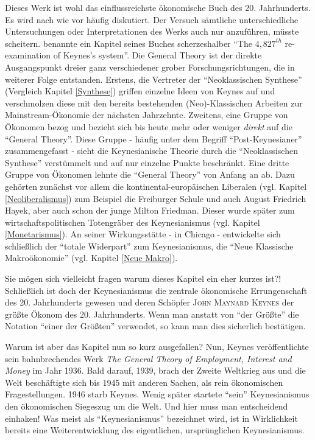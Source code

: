 Dieses Werk ist wohl das einflussreichste ökonomische Buch des 20. Jahrhunderts. Es wird nach wie vor häufig diskutiert. Der Versuch sämtliche unterschiedliche Untersuchungen oder Interpretationen des Werks auch nur anzuführen, müsste scheitern. \textcite[S. 38ff]{Weintraub1979} benannte ein Kapitel seines Buches scherzeshalber "`The $4,827^{th}$ re-examination of Keynes's system"'. Die General Theory ist der direkte Ausgangspunkt dreier ganz verschiedener grober Forschungsrichtungen, die in weiterer Folge entstanden. Erstens, die Vertreter der "`Neoklassischen Synthese"' (Vergleich Kapitel \ref{Synthese}) griffen einzelne Ideen von Keynes auf und verschmolzen diese mit den bereits bestehenden (Neo)-Klassischen Arbeiten zur Mainstream-Ökonomie der nächsten Jahrzehnte. Zweitens, eine Gruppe von Ökonomen bezog und bezieht sich bis heute mehr oder weniger \textit{direkt} auf die "`General Theory"'. Diese Gruppe - häufig unter dem Begriff "`Post-Keynesianer"' zusammengefasst - sieht die Keynesianische Theorie durch die "`Neoklassischen Synthese"' verstümmelt und auf nur einzelne Punkte beschränkt. Eine dritte Gruppe von Ökonomen lehnte die "`General Theory"' von Anfang an ab. Dazu gehörten zunächst vor allem die kontinental-europäischen Liberalen (vgl. Kapitel \ref{Neoliberalismus}) zum Beispiel die Freiburger Schule und auch August Friedrich Hayek, aber auch schon der junge Milton Friedman. Dieser wurde später zum wirtschaftspolitischen Totengräber des Keynesianismus (vgl. Kapitel \ref{Monetarismus}). An seiner Wirkungsstätte - in Chicago - entwickelte sich schließlich der "`totale Widerpart"' zum Keynesianismus, die "`Neue Klassische Makroökonomie"' (vgl. Kapitel \ref{Neue Makro}). 





Sie mögen sich vielleicht fragen warum dieses Kapitel ein eher kurzes ist?! Schließlich ist doch der Keynesianismus die zentrale ökonomische Errungenschaft des 20. Jahrhunderts gewesen und deren Schöpfer \textsc{John Maynard Keynes} der größte Ökonom des 20. Jahrhunderts. Wenn man anstatt von "`der Größte"' die Notation "`einer der Größten"' verwendet, so kann man dies sicherlich bestätigen.

Warum ist aber das Kapitel nun so kurz ausgefallen? Nun, Keynes veröffentlichte sein bahnbrechendes Werk \textit{The General Theory of Employment, Interest and Money} im Jahr 1936. Bald darauf, 1939, brach der Zweite Weltkrieg aus und die Welt beschäftigte sich bis 1945 mit anderen Sachen, als rein ökonomischen Fragestellungen. 1946 starb Keynes. Wenig später startete "`sein"' Keynesianismus den ökonomischen Siegeszug um die Welt. Und hier muss man entscheidend einhaken! Was meist als "`Keynesianismus"' bezeichnet wird, ist in Wirklichkeit bereits eine Weiterentwicklung des eigentlichen, ursprünglichen Keynesianismus.

